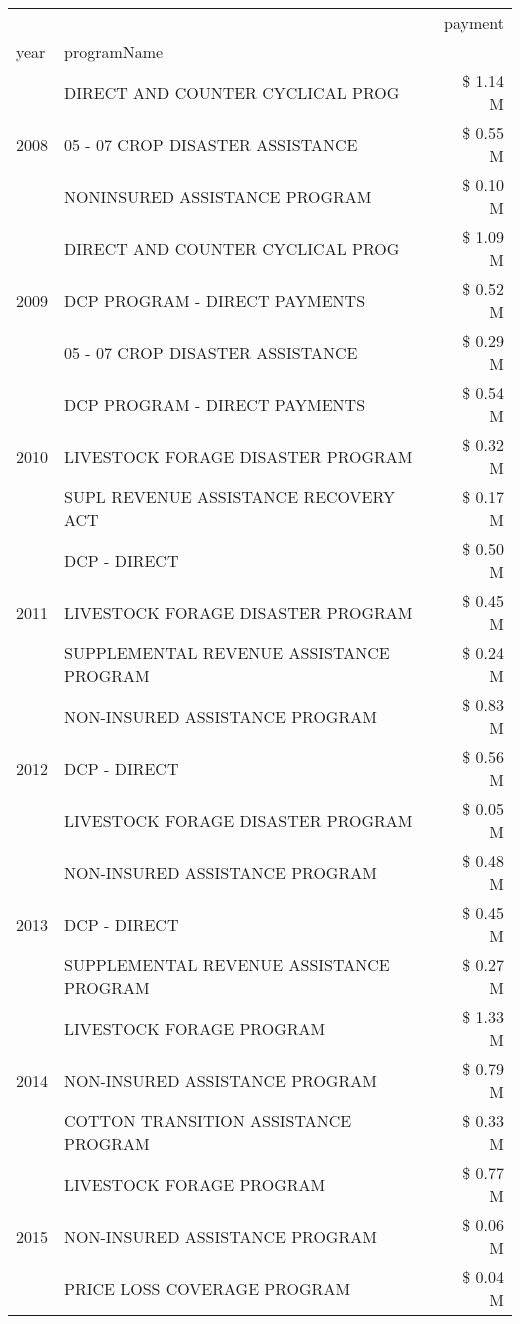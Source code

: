 \begin{tabular}{llr}
\toprule
 &  & payment \\
year & programName &  \\
\midrule
\multirow[t]{3}{*}{2008} & DIRECT AND COUNTER CYCLICAL PROG & \$ 1.14 M \\
 & 05 - 07 CROP DISASTER ASSISTANCE & \$ 0.55 M \\
 & NONINSURED ASSISTANCE PROGRAM & \$ 0.10 M \\
\cline{1-3}
\multirow[t]{3}{*}{2009} & DIRECT AND COUNTER CYCLICAL PROG & \$ 1.09 M \\
 & DCP PROGRAM - DIRECT PAYMENTS & \$ 0.52 M \\
 & 05 - 07 CROP DISASTER ASSISTANCE & \$ 0.29 M \\
\cline{1-3}
\multirow[t]{3}{*}{2010} & DCP PROGRAM - DIRECT PAYMENTS & \$ 0.54 M \\
 & LIVESTOCK FORAGE DISASTER  PROGRAM & \$ 0.32 M \\
 & SUPL REVENUE ASSISTANCE RECOVERY ACT & \$ 0.17 M \\
\cline{1-3}
\multirow[t]{3}{*}{2011} & DCP - DIRECT & \$ 0.50 M \\
 & LIVESTOCK FORAGE DISASTER PROGRAM & \$ 0.45 M \\
 & SUPPLEMENTAL REVENUE ASSISTANCE PROGRAM & \$ 0.24 M \\
\cline{1-3}
\multirow[t]{3}{*}{2012} & NON-INSURED ASSISTANCE PROGRAM & \$ 0.83 M \\
 & DCP - DIRECT & \$ 0.56 M \\
 & LIVESTOCK FORAGE DISASTER PROGRAM & \$ 0.05 M \\
\cline{1-3}
\multirow[t]{3}{*}{2013} & NON-INSURED ASSISTANCE PROGRAM & \$ 0.48 M \\
 & DCP - DIRECT & \$ 0.45 M \\
 & SUPPLEMENTAL REVENUE ASSISTANCE PROGRAM & \$ 0.27 M \\
\cline{1-3}
\multirow[t]{3}{*}{2014} & LIVESTOCK FORAGE PROGRAM & \$ 1.33 M \\
 & NON-INSURED ASSISTANCE PROGRAM & \$ 0.79 M \\
 & COTTON TRANSITION ASSISTANCE PROGRAM & \$ 0.33 M \\
\cline{1-3}
\multirow[t]{3}{*}{2015} & LIVESTOCK FORAGE PROGRAM & \$ 0.77 M \\
 & NON-INSURED ASSISTANCE PROGRAM & \$ 0.06 M \\
 & PRICE LOSS COVERAGE PROGRAM & \$ 0.04 M \\
\cline{1-3}

\end{tabular}
